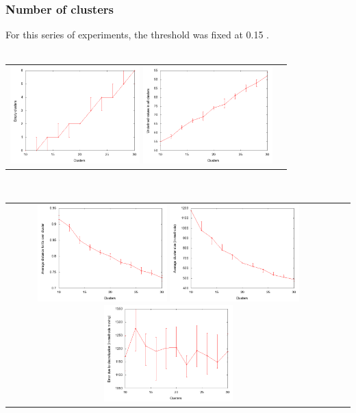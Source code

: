\documentclass[12pt]{article}
\begin{document}
\subsubsection{Number of clusters}
For this series of experiments, the threshold was fixed at 0.15 . 
\\ \\
\begin{center}
\begin{tabular}{c c}
\includegraphics[width=5cm]{images/emptyCluster.png}
\includegraphics[width=5cm]{images/questionMark.png}
\end{tabular}\\
\begin{tabular}{c c c}
\includegraphics[width=5cm]{images/averageDist.png}
\includegraphics[width=5cm]{images/averageClusterSize.png}
\includegraphics[width=5cm]{images/switched.png}
\end{tabular}
\end{center}
\end{document}
